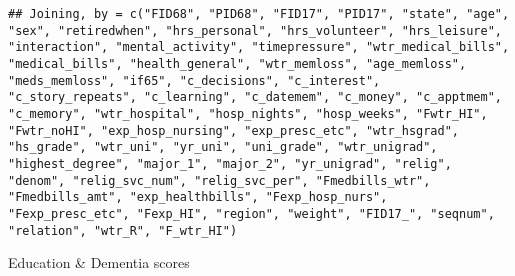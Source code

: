 \documentclass[]{article}
\begin{document}
\begin{verbatim}
## Joining, by = c("FID68", "PID68", "FID17", "PID17", "state", "age", "sex", "retiredwhen", "hrs_personal", "hrs_volunteer", "hrs_leisure", "interaction", "mental_activity", "timepressure", "wtr_medical_bills", "medical_bills", "health_general", "wtr_memloss", "age_memloss", "meds_memloss", "if65", "c_decisions", "c_interest", "c_story_repeats", "c_learning", "c_datemem", "c_money", "c_apptmem", "c_memory", "wtr_hospital", "hosp_nights", "hosp_weeks", "Fwtr_HI", "Fwtr_noHI", "exp_hosp_nursing", "exp_presc_etc", "wtr_hsgrad", "hs_grade", "wtr_uni", "yr_uni", "uni_grade", "wtr_unigrad", "highest_degree", "major_1", "major_2", "yr_unigrad", "relig", "denom", "relig_svc_num", "relig_svc_per", "Fmedbills_wtr", "Fmedbills_amt", "exp_healthbills", "Fexp_hosp_nurs", "Fexp_presc_etc", "Fexp_HI", "region", "weight", "FID17_", "seqnum", "relation", "wtr_R", "F_wtr_HI")
\end{verbatim}

Education \& Dementia scores
\end{document}
